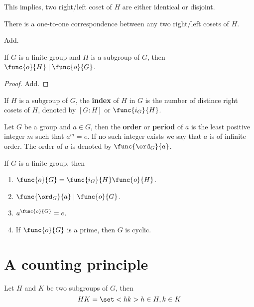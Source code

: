 This implies, two right/left coset of \(H\) are either identical or disjoint.

\begin{lemma}
    There is a one-to-one correspondence between any two right/left cosets of \(H\).
\end{lemma}

\begin{prooflemma}
    Add.
\end{prooflemma}

\begin{theorem}
    If \(G\) is a finite group and \(H\) is a subgroup of \(G\), then \(\func{o}{H} \mid \func{o}{G}\).
\end{theorem}

\begin{proof}
    Add.
\end{proof}

\begin{definition}
    If \(H\) is a subgroup of \(G\), the \textbf{index} of \(H\) in \(G\) is the number of distince right cosets of \(H\), denoted by \([G:H]\) or \(\func{i_G}{H}\).
\end{definition}

\begin{definition}
    Let \(G\) be a group and \(a \in G\), then the \textbf{order} or \textbf{period} of \(a\) is the least positive integer \(m\) such that \(a^m = e\). If no such integer exists we say that \(a\) is of infinite order. The order of \(a\) is denoted by \(\func{\ord_G}{a}\).
\end{definition}

\begin{corollary}
    If \(G\) is a finite group, then 
    \begin{enumerate}
        \item \(\func{o}{G} = \func{i_G}{H} \func{o}{H}\).
        \item \(\func{\ord_G}{a} \mid \func{o}{G}\).
        \item \(a^{\func{o}{G}} = e\).
        \item If \(\func{o}{G}\) is a prime, then \(G\) is cyclic.
    \end{enumerate}
\end{corollary}

\section{A counting principle}
Let \(H\) and \(K\) be two subgroups of \(G\), then 
\begin{equation*}
    HK = \set<hk>{h \in H, k \in K}
\end{equation*}

